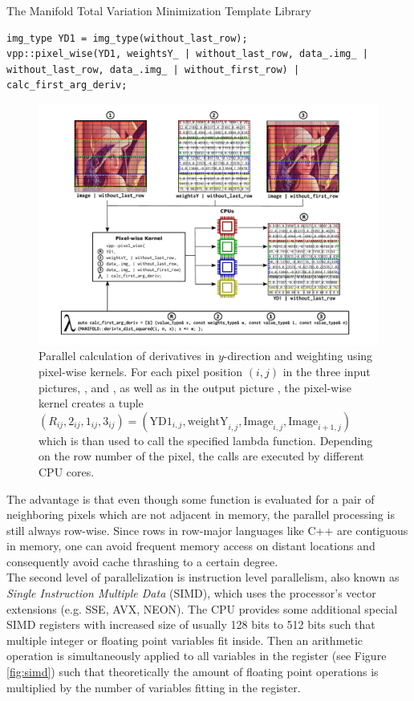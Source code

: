 \begin{chapter}{The Manifold Total Variation Minimization Template Library}
\begin{lstlisting}[label=code:pixelwise_demo,caption={Pixel-wise forward derivative computation}]
img_type YD1 = img_type(without_last_row);
vpp::pixel_wise(YD1, weightsY_ | without_last_row, data_.img_ | without_last_row, data_.img_ | without_first_row) | calc_first_arg_deriv;
\end{lstlisting}

\begin{figure}[h!]
        \centering
	    \includegraphics[width=1.0\linewidth]{./figures/library/pixelwise_kernel.pdf}
	\caption[Calculation using pixel-wise kernels]{Parallel calculation of derivatives in $y$-direction and weighting using pixel-wise kernels.
	    For each pixel position $(i,j)$ in the three input pictures, ,  and , as well as in the output picture
	    , the pixel-wise kernel creates a tuple $(R_{ij}, 2_{ij}, 1_{ij}, 3_{ij})=(\text{YD1}_{i,j},\text{weightY}_{i,j},\text{Image}_{i,j},\text{Image}_{i+1,j})$
	    which is than used to call the specified lambda function. Depending on the row number of the pixel, the calls are executed by different CPU cores.
	}
	\label{fig:pixelwise_kernel}
\end{figure}

The advantage is that even though some function is evaluated for a pair of neighboring pixels which are not adjacent in memory, the parallel processing is still
always row-wise. Since rows in row-major languages like C++ are contiguous in memory, one can avoid frequent memory access on distant locations and consequently avoid cache thrashing to a certain degree.\\

The second level of parallelization is instruction level parallelism, also known as \textit{Single Instruction Multiple Data} (SIMD), which uses the
processor's vector extensions (e.g. SSE, AVX, NEON).
The CPU provides some additional special SIMD registers with increased size of usually 128 bits to 512 bits such that multiple integer or floating point variables fit inside.
Then an arithmetic operation is simultaneously applied to all variables in the register (see Figure \ref{fig:simd}) such that theoretically the amount of floating point operations is multiplied by the number
of variables fitting in the register. \\


\end{chapter}
